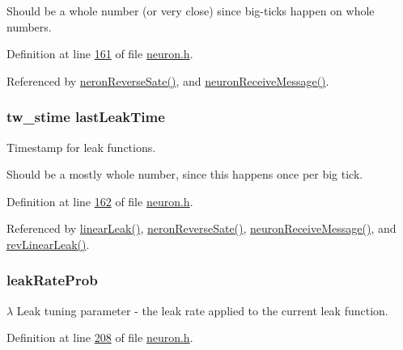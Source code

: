 Should be a whole number (or very close) since big-\/ticks happen on whole numbers. 

Definition at line \hyperlink{neuron_8h_source_l00161}{161} of file \hyperlink{neuron_8h_source}{neuron.\+h}.



Referenced by \hyperlink{neuron_8c_source_l00232}{neron\+Reverse\+Sate()}, and \hyperlink{neuron_8c_source_l00103}{neuron\+Receive\+Message()}.

\hypertarget{structneuron_state_a6f4e4d8fc1cf0257b486e01f628d2656}{}
\subsubsection[{last\+Leak\+Time}]{\setlength{\rightskip}{0pt plus 5cm}tw\+\_\+stime last\+Leak\+Time}\label{structneuron_state_a6f4e4d8fc1cf0257b486e01f628d2656}


Timestamp for leak functions. 

Should be a mostly whole number, since this happens once per big tick. 

Definition at line \hyperlink{neuron_8h_source_l00162}{162} of file \hyperlink{neuron_8h_source}{neuron.\+h}.



Referenced by \hyperlink{neuron_8c_source_l00028}{linear\+Leak()}, \hyperlink{neuron_8c_source_l00232}{neron\+Reverse\+Sate()}, \hyperlink{neuron_8c_source_l00103}{neuron\+Receive\+Message()}, and \hyperlink{neuron_8c_source_l00037}{rev\+Linear\+Leak()}.

\hypertarget{structneuron_state_ac580cc92949834b3675de3aae267e8e7}{}
\subsubsection[{leak\+Rate\+Prob}]{ leak\+Rate\+Prob}\label{structneuron_state_ac580cc92949834b3675de3aae267e8e7}


$𝜆$ Leak tuning parameter -\/ the leak rate applied to the current leak function. 



Definition at line \hyperlink{neuron_8h_source_l00208}{208} of file \hyperlink{neuron_8h_source}{neuron.\+h}.

